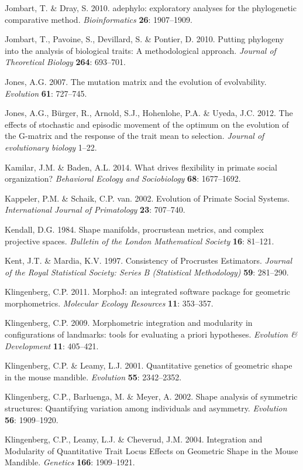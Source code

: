 \documentclass[12pt,twoside]{report}
\begin{document}
Jombart, T. \& Dray, S. 2010. adephylo: exploratory analyses for the
phylogenetic comparative method. \emph{Bioinformatics} \textbf{26}:
1907--1909.

Jombart, T., Pavoine, S., Devillard, S. \& Pontier, D. 2010. Putting
phylogeny into the analysis of biological traits: A methodological
approach. \emph{Journal of Theoretical Biology} \textbf{264}: 693--701.

Jones, A.G. 2007. The mutation matrix and the evolution of evolvability.
\emph{Evolution} \textbf{61}: 727--745.

Jones, A.G., Bürger, R., Arnold, S.J., Hohenlohe, P.A. \& Uyeda, J.C.
2012. The effects of stochastic and episodic movement of the optimum on
the evolution of the G-matrix and the response of the trait mean to
selection. \emph{Journal of evolutionary biology} 1--22.

Kamilar, J.M. \& Baden, A.L. 2014. What drives flexibility in primate
social organization? \emph{Behavioral Ecology and Sociobiology}
\textbf{68}: 1677--1692.

Kappeler, P.M. \& Schaik, C.P. van. 2002. Evolution of Primate Social
Systems. \emph{International Journal of Primatology} \textbf{23}:
707--740.

Kendall, D.G. 1984. Shape manifolds, procrustean metrics, and complex
projective spaces. \emph{Bulletin of the London Mathematical Society}
\textbf{16}: 81--121.

Kent, J.T. \& Mardia, K.V. 1997. Consistency of Procrustes Estimators.
\emph{Journal of the Royal Statistical Society: Series B (Statistical
Methodology)} \textbf{59}: 281--290.

Klingenberg, C.P. 2011. MorphoJ: an integrated software package for
geometric morphometrics. \emph{Molecular Ecology Resources} \textbf{11}:
353--357.

Klingenberg, C.P. 2009. Morphometric integration and modularity in
configurations of landmarks: tools for evaluating a priori hypotheses.
\emph{Evolution \& Development} \textbf{11}: 405--421.

Klingenberg, C.P. \& Leamy, L.J. 2001. Quantitative genetics of
geometric shape in the mouse mandible. \emph{Evolution} \textbf{55}:
2342--2352.

Klingenberg, C.P., Barluenga, M. \& Meyer, A. 2002. Shape analysis of
symmetric structures: Quantifying variation among individuals and
asymmetry. \emph{Evolution} \textbf{56}: 1909--1920.

Klingenberg, C.P., Leamy, L.J. \& Cheverud, J.M. 2004. Integration and
Modularity of Quantitative Trait Locus Effects on Geometric Shape in the
Mouse Mandible. \emph{Genetics} \textbf{166}: 1909--1921.
\end{document}
